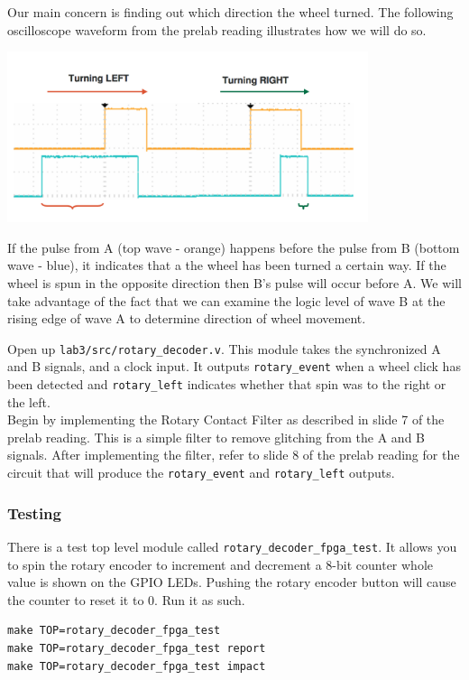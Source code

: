 \documentclass[11pt]{article}
\begin{document}
Our main concern is finding out which direction the wheel turned. The following oscilloscope waveform from the prelab reading illustrates how we will do so. 

\begin{center}
	\includegraphics[height=5cm]{images/lab2_fig6.png}
\end{center}

If the pulse from A (top wave - orange) happens before the pulse from B (bottom wave - blue), it indicates that a the wheel has been turned a certain way. If the wheel is spun in the opposite direction then B's pulse will occur before A. We will take advantage of the fact that we can examine the logic level of wave B at the rising edge of wave A to determine direction of wheel movement.

Open up \verb|lab3/src/rotary_decoder.v|. This module takes the synchronized A and B signals, and a clock input. It outputs \verb|rotary_event| when a wheel click has been detected and \verb|rotary_left| indicates whether that spin was to the right or the left.\\

Begin by implementing the Rotary Contact Filter as described in slide 7 of the prelab reading. This is a simple filter to remove glitching from the A and B signals. After implementing the filter, refer to slide 8 of the prelab reading for the circuit that will produce the \verb|rotary_event| and \verb|rotary_left| outputs.

\subsubsection{Testing}
There is a test top level module called \verb|rotary_decoder_fpga_test|. It allows you to spin the rotary encoder to increment and decrement a 8-bit counter whole value is shown on the GPIO LEDs. Pushing the rotary encoder button will cause the counter to reset it to 0. Run it as such.

\begin{verbatim}
make TOP=rotary_decoder_fpga_test
make TOP=rotary_decoder_fpga_test report
make TOP=rotary_decoder_fpga_test impact
\end{verbatim} 
\end{document}
